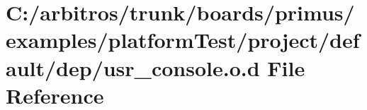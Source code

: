 \hypertarget{platform_test_2project_2default_2dep_2usr__console_8o_8d}{\section{C\-:/arbitros/trunk/boards/primus/examples/platform\-Test/project/default/dep/usr\-\_\-console.o.\-d File Reference}
\label{platform_test_2project_2default_2dep_2usr__console_8o_8d}
}
